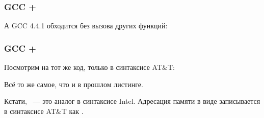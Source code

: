 \subsubsection{GCC + \IntelSyntax}

А GCC 4.4.1 обходится без вызова других функций:



\subsubsection{GCC + \ATTSyntax}

Посмотрим на тот же код, только в синтаксисе AT\&T:



\myindex{\ATTSyntax}
Всё то же самое, что и в прошлом листинге.

Кстати, ~--- это аналог  в синтаксисе Intel.
Адресация памяти в виде  записывается в синтаксисе AT\&T как .

